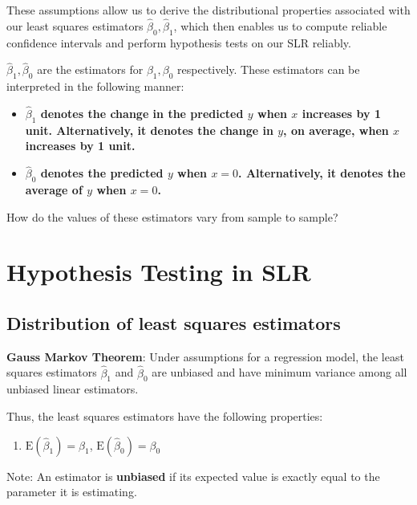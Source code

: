 \documentclass[
]{book}
\providecommand{\tightlist}{%
  \setlength{\itemsep}{0pt}\setlength{\parskip}{0pt}}
\begin{document}
These assumptions allow us to derive the distributional properties associated with our least squares estimators \(\hat{\beta}_0, \hat{\beta}_1\), which then enables us to compute reliable confidence intervals and perform hypothesis tests on our SLR reliably.

\(\hat{\beta}_1,\hat{\beta}_0\) are the estimators for \(\beta_1,\beta_0\) respectively. These estimators can be interpreted in the following manner:

\begin{itemize}
\tightlist
\item
  \textbf{\(\hat{\beta}_1\) denotes the change in the predicted \(y\) when \(x\) increases by 1 unit. Alternatively, it denotes the change in \(y\), on average, when \(x\) increases by 1 unit.}
\item
  \textbf{\(\hat{\beta}_0\) denotes the predicted \(y\) when \(x=0\). Alternatively, it denotes the average of \(y\) when \(x=0\).}
\end{itemize}

How do the values of these estimators vary from sample to sample?

\hypertarget{hypothesis-testing-in-slr}{%
\section{Hypothesis Testing in SLR}\label{hypothesis-testing-in-slr}}

\hypertarget{distribution-of-least-squares-estimators}{%
\subsection{Distribution of least squares estimators}\label{distribution-of-least-squares-estimators}}

\textbf{Gauss Markov Theorem}: Under assumptions for a regression model, the least squares estimators \(\hat{\beta}_1\) and \(\hat{\beta}_0\) are unbiased and have minimum variance among all unbiased linear estimators.

Thus, the least squares estimators have the following properties:

\begin{enumerate}
\def\labelenumi{\arabic{enumi}.}
\tightlist
\item
  \(\mbox{E}(\hat{\beta}_1) = \beta_1\), \(\mbox{E}(\hat{\beta}_0) = \beta_0\)
\end{enumerate}

Note: An estimator is \textbf{unbiased} if its expected value is exactly equal to the parameter it is estimating.
\end{document}
